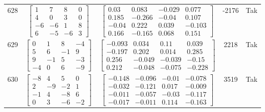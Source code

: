 \documentclass[a4paper,12pt]{article}
\begin{document}
\begin{tabular}{c c c c c}
628
&
$\begin{bmatrix} 1 & 7 & 8 & 0 \\ 4 & 0 & 3 & 0 \\ -6 & -6 & 1 & 8 \\ 6 & -5 & -6 & 3 \end{bmatrix}$
&
$\begin{bmatrix} 0.03 & 0.083 & -0.029 & 0.077 \\ 0.185 & -0.266 & -0.04 & 0.107 \\ -0.04 & 0.222 & 0.039 & -0.103 \\ 0.166 & -0.165 & 0.068 & 0.151 \end{bmatrix}$
&
-2176
&
Tak
\\
629
&
$\begin{bmatrix} 0 & 1 & 8 & -4 \\ 5 & 6 & -1 & 9 \\ 9 & -1 & 5 & -3 \\ -4 & 0 & 6 & -9 \end{bmatrix}$
&
$\begin{bmatrix} -0.093 & 0.034 & 0.11 & 0.039 \\ -0.197 & 0.202 & 0.014 & 0.285 \\ 0.256 & -0.049 & -0.039 & -0.15 \\ 0.212 & -0.048 & -0.075 & -0.228 \end{bmatrix}$
&
2218
&
Tak
\\
630
&
$\begin{bmatrix} -8 & 4 & 5 & 0 \\ 2 & -9 & -2 & 1 \\ -1 & 4 & -8 & 6 \\ 0 & 3 & -6 & -2 \end{bmatrix}$
&
$\begin{bmatrix} -0.148 & -0.096 & -0.01 & -0.078 \\ -0.032 & -0.121 & 0.017 & -0.009 \\ -0.011 & -0.057 & -0.03 & -0.117 \\ -0.017 & -0.011 & 0.114 & -0.163 \end{bmatrix}$
&
3519
&
Tak
\\
\end{tabular} \egroup \newpage
\end{document}
